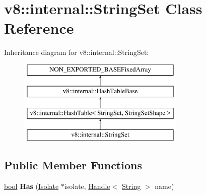 \hypertarget{classv8_1_1internal_1_1StringSet}{}\section{v8\+:\+:internal\+:\+:String\+Set Class Reference}
\label{classv8_1_1internal_1_1StringSet}
Inheritance diagram for v8\+:\+:internal\+:\+:String\+Set\+:\begin{figure}[H]
\begin{center}
\leavevmode
\includegraphics[height=4.000000cm]{classv8_1_1internal_1_1StringSet}
\end{center}
\end{figure}
\subsection*{Public Member Functions}
\begin{DoxyCompactItemize}
\item 
\mbox{\label{classv8_1_1internal_1_1StringSet_ad0dc494eaeacee2a5a3c1941bdaf4a7a}} 
\mbox{\hyperlink{classbool}{bool}} {\bfseries Has} (\mbox{\hyperlink{classv8_1_1internal_1_1Isolate}{Isolate}} $\ast$isolate, \mbox{\hyperlink{classv8_1_1internal_1_1Handle}{Handle}}$<$ \mbox{\hyperlink{classv8_1_1internal_1_1String}{String}} $>$ name)
\end{DoxyCompactItemize}
